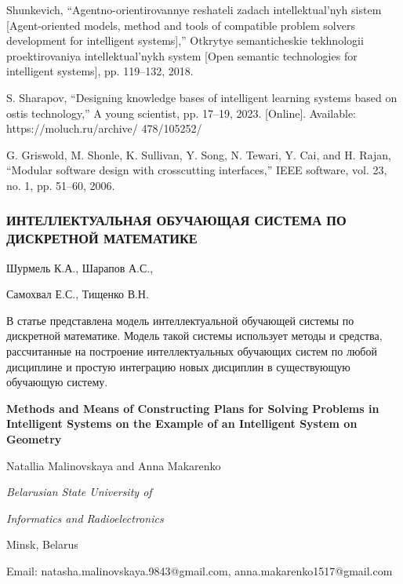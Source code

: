 \documentclass [11pt, a4paper]{article}
\begin{document}
\begin{multicols}{2}
\begin{enumerate}
{\item Shunkevich, “Agentno-orientirovannye reshateli zadach
intellektual’nyh sistem [Agent-oriented models, method and
tools of compatible problem solvers development for intelligent
systems],” Otkrytye semanticheskie tekhnologii proektirovaniya
intellektual’nykh system [Open semantic technologies for
intelligent systems], pp. 119–132, 2018.
\item S. Sharapov, “Designing knowledge bases of intelligent
learning systems based on ostis technology,” A young scientist,
pp. 17–19, 2023. [Online]. Available: https://moluch.ru/archive/
478/105252/
\item G. Griswold, M. Shonle, K. Sullivan, Y. Song, N. Tewari,
Y. Cai, and H. Rajan, “Modular software design with crosscutting
interfaces,” IEEE software, vol. 23, no. 1, pp. 51–60, 2006.
}
\end{enumerate}
\begin{center}
\subsubsection*{ИНТЕЛЛЕКТУАЛЬНАЯ ОБУЧАЮЩАЯ
СИСТЕМА ПО ДИСКРЕТНОЙ
МАТЕМАТИКЕ}
\end{center}
\begin{center}
\large Шурмель К.А., Шарапов А.С., \par\quad \large Самохвал Е.С., Тищенко В.Н.
\end{center}
\par \quad В статье представлена модель интеллектуальной обучающей системы по дискретной математике. Модель такой системы использует методы и средства, рассчитанные на построение интеллектуальных обучающих систем по любой дисциплине и простую интеграцию новых дисциплин в существующую обучающую систему.

\begin{flushright}
\end{flushright}

\end{multicols}
\begin{center}

 \textbf{\huge{Methods and Means of Constructing Plans for
Solving Problems in Intelligent Systems on the
Example of an Intelligent System on Geometry}}
\\\quad
\begin{center}
   { Natallia Malinovskaya and Anna Makarenko\par
\textit{Belarusian State University of} \par
\textit{Informatics and Radioelectronics}\par
Minsk, Belarus\par
Email: natasha.malinovskaya.9843@gmail.com, anna.makarenko1517@gmail.com}
\end{center}

\end{center}
\end{document}
